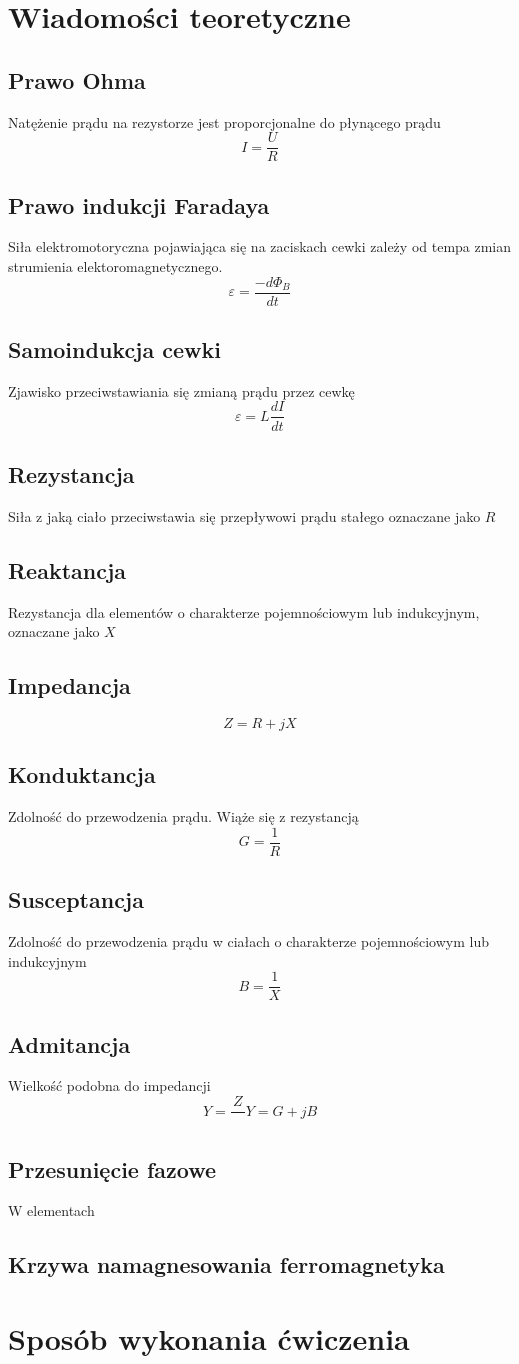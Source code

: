\documentclass[11pt]{article}
\begin{document}
\section{Wiadomości teoretyczne}

\subsection{Prawo Ohma}
Natężenie prądu na rezystorze jest proporcjonalne do płynącego prądu $$ I = \frac{U}{R} $$
\subsection{Prawo indukcji Faradaya}
Siła elektromotoryczna pojawiająca się na zaciskach cewki zależy od tempa zmian strumienia elektoromagnetycznego.
$$ \varepsilon = \frac{-d\Phi_B}{dt} $$
\subsection{Samoindukcja cewki}
Zjawisko przeciwstawiania się zmianą prądu przez cewkę
$$ \varepsilon = L \frac{dI}{dt} $$
\subsection{Rezystancja}
Siła z jaką ciało przeciwstawia się przepływowi prądu stałego oznaczane jako $R$ 
\subsection{Reaktancja}
Rezystancja dla elementów o charakterze pojemnościowym lub indukcyjnym, oznaczane jako $X$
\subsection{Impedancja}
$$ Z = R + jX $$
\subsection{Konduktancja}
Zdolność do przewodzenia prądu. Wiąże się z rezystancją $$ G = \frac{1}{R}$$
\subsection{Susceptancja}
Zdolność do przewodzenia prądu w ciałach o charakterze pojemnościowym lub indukcyjnym
$$ B = \frac{1}{X} $$
\subsection{Admitancja}
Wielkość podobna do impedancji
$$ Y = \frac{Z} \quad Y = G + jB $$
\subsection{Przesunięcie fazowe}
W elementach 
\subsection{Krzywa namagnesowania ferromagnetyka}

\section{Sposób wykonania ćwiczenia}
\end{document}
